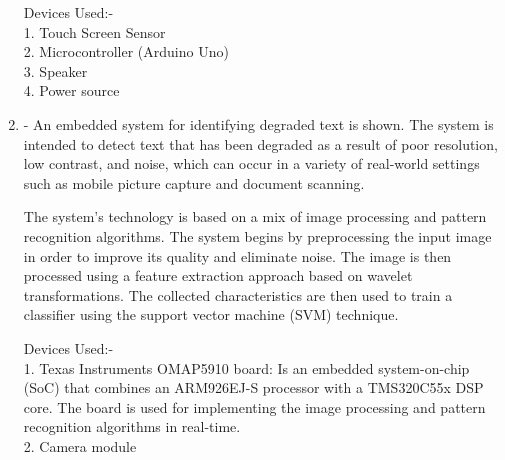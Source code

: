 \documentclass[MScCS]{uccthesis}
\begin{document}
\begin{enumerate}
Devices Used:-\\
1. Touch Screen Sensor\\
2. Microcontroller (Arduino Uno)\\
3. Speaker\\
4. Power source

\item \textbf{\Parencite{embedded}}- An embedded system for identifying degraded text is shown. The system is intended to detect text that has been degraded as a result of poor resolution, low contrast, and noise, which can occur in a variety of real-world settings such as mobile picture capture and document scanning.

The system's technology is based on a mix of image processing and pattern recognition algorithms. The system begins by preprocessing the input image in order to improve its quality and eliminate noise. The image is then processed using a feature extraction approach based on wavelet transformations. The collected characteristics are then used to train a classifier using the support vector machine (SVM) technique.

Devices Used:-\\
1. Texas Instruments OMAP5910 board: Is an embedded system-on-chip (SoC) that combines an ARM926EJ-S processor with a TMS320C55x DSP core. The board is used for implementing the image processing and pattern recognition algorithms in real-time.\\ 
2. Camera module

\end{enumerate}
\end{document}
